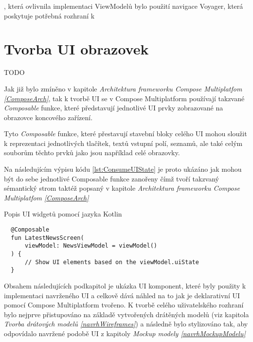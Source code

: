 , která ovlivnila implementaci ViewModelů bylo použití navigace Voyager, která poskytuje potřebná rozhraní k 



\section{Tvorba UI obrazovek}
TODO %

Jak již bylo zmíněno v kapitole \textit{Architektura frameworku Compose Multiplatfom \ref{ComposeArch}}, tak k tvorbě UI se v Compose Multiplatform 
používají takzvané \textit{Composable} funkce, které představují jednotlivé UI prvky zobrazované na obrazovce koncového zařízení. 

Tyto \textit{Composable} funkce, které přestavují stavební bloky celého UI mohou sloužit k reprezentaci jednotlivých tlačítek, textů vstupní polí, 
seznamů, ale také celým souborům těchto prvků jako jsou například celé obrazovky.

Na následujícím výpisu kódu \ref{lst:ConsumeUIState} je proto ukázáno jak mohou být do sebe jednotlivé Composable funkce zanořeny čímž tvoří
takzvaný sémantický strom taktéž popsaný v kapitole \textit{Architektura frameworku Compose Multiplatfom \ref{ComposeArch}}

\begin{listing}
\caption{Popis UI widgetů pomocí jazyka Kotlin}\label{lst:ConsumeUIState}
\begin{verbatim}
  @Composable
  fun LatestNewsScreen(
      viewModel: NewsViewModel = viewModel()
  ) {
      // Show UI elements based on the viewModel.uiState
  }
\end{verbatim}
\end{listing}



\bigskip

Obsahem následujících podkapitol je ukázka UI komponent, které byly použity k implementaci navrženého UI a celkově dává náhled na to
jak je deklarativní UI pomocí Compose Multiplatform tvořeno. K tvorbě celého uživatelského rozhraní bylo nejprve přistupováno na základě vytvořených 
drátěných modelů (viz kapitola \textit{Tvorba drátových modelů \ref{navrhWireframes}}) a následně bylo stylizováno tak, aby odpovídalo navržené podobě UI z kapitoly \textit{Mockup modely \ref{navrhMockupModelu}}

